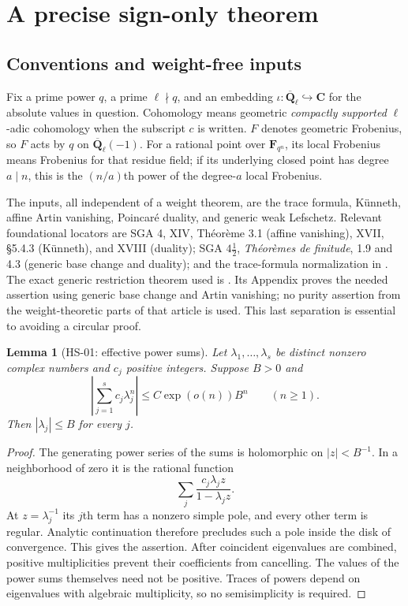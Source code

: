\documentclass[11pt,a4paper]{article}
\newtheorem{lemma}[theorem]{Lemma}
\theoremstyle{remark}
\begin{document}
\section{A precise sign-only theorem}
\label{sec:sign}

\subsection{Conventions and weight-free inputs}
Fix a prime power $q$, a prime $\ell\nmid q$, and an embedding
$\iota:\overline{\mathbf Q}_\ell\hookrightarrow\mathbf C$ for the
absolute values in question.  Cohomology means geometric \emph{compactly
supported} \(\ell\)-adic cohomology when the subscript $c$ is written.
$F$ denotes geometric Frobenius, so $F$ acts by $q$ on
$\overline{\mathbf Q}_\ell(-1)$.  For a rational point over
$\mathbf F_{q^n}$, its local Frobenius means Frobenius for that residue
field; if its underlying closed point has degree $a\mid n$, this is the
$(n/a)$th power of the degree-$a$ local Frobenius.

The inputs, all independent of a weight theorem, are the trace formula,
K\"unneth, affine Artin vanishing, Poincar\'e duality, and generic weak
Lefschetz.  Relevant foundational locators are SGA 4, XIV, Th\'eor\`eme 3.1
(affine vanishing), XVII, \S5.4.3 (K\"unneth), and XVIII (duality);
SGA $4\frac12$, \emph{Th\'eor\`emes de finitude}, 1.9 and 4.3 (generic
base change and duality); and the trace-formula normalization in
\cite[(1.5.1), (1.5.4), (2.3), (2.14)]{WeilI}.
The exact generic restriction theorem used is
\cite[Theorem 3.4, Corollary 3.4.1, pp.~180--181;
Appendix A.5, pp.~220--221]{KatzACT}.
Its Appendix proves the needed assertion using generic base change and
Artin vanishing; no purity assertion from the weight-theoretic parts of
that article is used.  This last separation is essential to avoiding a
circular proof.

\begin{lemma}[HS-01: effective power sums]
\label{lem:power}
Let $\lambda_1,\ldots,\lambda_s$ be distinct nonzero complex numbers and
$c_j$ positive integers.  Suppose $B>0$ and
\[
 \left|\sum_{j=1}^s c_j\lambda_j^n\right|
 \le C\exp(o(n)) B^n \qquad(n\ge1).
\]
Then $|\lambda_j|\le B$ for every $j$.
\end{lemma}
\begin{proof}
The generating power series of the sums is holomorphic on $|z|<B^{-1}$.
In a neighborhood of zero it is the rational function
\[
 \sum_j \frac{c_j\lambda_j z}{1-\lambda_j z}.
\]
At $z=\lambda_j^{-1}$ its $j$th term has a nonzero simple pole, and every
other term is regular.  Analytic continuation therefore precludes such a
pole inside the disk of convergence.  This gives the assertion.  After
coincident eigenvalues are combined, positive multiplicities prevent their
coefficients from cancelling.  The values of the power sums themselves
need not be positive.  Traces of powers depend on eigenvalues with algebraic
multiplicity, so no semisimplicity is required.
\end{proof}
\end{document}
